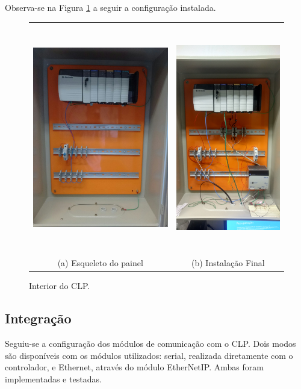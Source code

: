 Observa-se na Figura \ref{fig:modulos} a seguir a configuração instalada.
\begin{figure}[H]
	\centering
	\begin{tabular}{cc}
		\includegraphics[height=10cm,keepaspectratio]{figs/modulos.jpg} &
		\includegraphics[height=10cm,keepaspectratio]{figs/interior_comp.jpg} \\
		(a) Esqueleto do painel &
		(b) Instalação Final
	\end{tabular}
	\caption{\label{fig:modulos} Interior do CLP.}
\end{figure}

\subsection{Integração}
Seguiu-se a configuração dos módulos de comunicação com o CLP. Dois modos são disponíveis com os módulos utilizados: serial, realizada diretamente com o controlador, e Ethernet, através do módulo EtherNetIP. Ambas foram implementadas e testadas.

